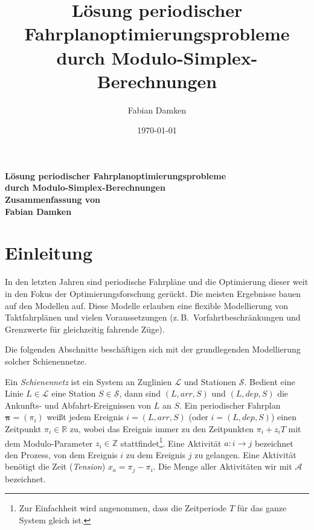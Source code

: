 \documentclass[accentcolor = tud11b, a4paper, 11pt, twocolumn]{scrartcl}
\title{Lösung periodischer Fahrplanoptimierungsprobleme durch Modulo-Simplex-Berechnungen}
\author{Fabian Damken}
\date{\today}
\newcommand{\arr}{\mathit{arr}}
\newcommand{\dep}{\mathit{dep}}
\newcommand{\R}{\ensuremath{\mathbb{R}}}
\newcommand{\Z}{\ensuremath{\mathbb{Z}}}
\renewcommand{\vec}[1]{\boldsymbol{\mathbf{#1}}}
\newcommand{\zB}{z.\,B.~}
\begin{document}
	

	\makeatletter
	\begin{center}
		\textbf{\Large Lösung periodischer \mbox{Fahrplanoptimierungsprobleme} \\ \vspace{2mm} durch Modulo-Simplex-Berechnungen} \\ \vspace{2mm}
		\textbf{\large Zusammenfassung von \cite{nachtigallSolvingPeriodicTimetable2008}} \\ \vspace{3mm}
		\textbf{\large Fabian Damken} \\ \vspace{1mm}
		{\large \@date}
	\end{center}
	\makeatother

	\section{Einleitung}
		In den letzten Jahren sind periodische Fahrpläne und die Optimierung dieser weit in den Fokus der Optimierungsforschung gerückt. Die meisten Ergebnisse bauen auf den Modellen \cite{serafiniMathematicalModelPeriodic1989} auf. Diese Modelle erlauben eine flexible Modellierung von Taktfahrplänen und vielen Voraussetzungen (\zB Vorfahrtbeschränkungen und Grenzwerte für gleichzeitig fahrende Züge).
		
		Die folgenden Abschnitte beschäftigen sich mit der grundlegenden Modellierung solcher Schienennetze.
		
		Ein \emph{Schienennetz} ist ein System an Zuglinien \(\mathcal{L}\) und Stationen \(\mathcal{S}\). Bedient eine Linie \(L \in \mathcal{L}\) eine Station \(S \in \mathcal{S}\), dann sind \( (L, \arr, S) \) und \( (L, \dep, S) \) die Ankunfts- und Abfahrt-Ereignissen von \(L\) an \(S\). Ein periodischer Fahrplan \( \vec{\pi} = (\pi_i) \) weißt jedem Ereignis \( i = (L, \arr, S) \) (oder \( i = (L, \dep, S) \)) einen Zeitpunkt \( \pi_i \in \R \) zu, wobei das Ereignis immer zu den Zeitpunkten \( \pi_i + z_i T \) mit dem Modulo-Parameter \( z_i \in \Z \) stattfindet\footnote{Zur Einfachheit wird angenommen, dass die Zeitperiode \(T\) für das ganze System gleich ist.}. Eine Aktivität \( a : i \to j \) bezeichnet den Prozess, von dem Ereignis \(i\) zu dem Ereignis \(j\) zu gelangen. Eine Aktivität benötigt die Zeit (\emph{Tension}) \( x_a = \pi_j - \pi_i \). Die Menge aller Aktivitäten wir mit \( \mathcal{A} \) bezeichnet.
		
\end{document}
